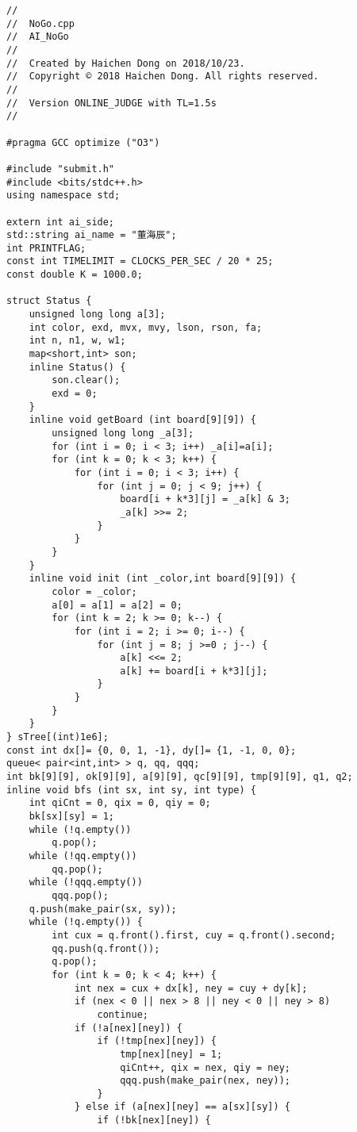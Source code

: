 \documentclass[UTF8]{article}
\theoremstyle{definition}
\begin{document}
\begin{lstlisting}
//
//  NoGo.cpp
//  AI_NoGo
//
//  Created by Haichen Dong on 2018/10/23.
//  Copyright © 2018 Haichen Dong. All rights reserved.
//
//  Version ONLINE_JUDGE with TL=1.5s
//

#pragma GCC optimize ("O3")

#include "submit.h"
#include <bits/stdc++.h>
using namespace std;

extern int ai_side;
std::string ai_name = "董海辰";
int PRINTFLAG;
const int TIMELIMIT = CLOCKS_PER_SEC / 20 * 25;
const double K = 1000.0;

struct Status {
    unsigned long long a[3];
    int color, exd, mvx, mvy, lson, rson, fa;
    int n, n1, w, w1;
    map<short,int> son;
    inline Status() {
        son.clear();
        exd = 0;
    }
    inline void getBoard (int board[9][9]) {
        unsigned long long _a[3];
        for (int i = 0; i < 3; i++) _a[i]=a[i];
        for (int k = 0; k < 3; k++) {
            for (int i = 0; i < 3; i++) {
                for (int j = 0; j < 9; j++) {
                    board[i + k*3][j] = _a[k] & 3;
                    _a[k] >>= 2;
                }
            }
        }
    }
    inline void init (int _color,int board[9][9]) {
        color = _color;
        a[0] = a[1] = a[2] = 0;
        for (int k = 2; k >= 0; k--) {
            for (int i = 2; i >= 0; i--) {
                for (int j = 8; j >=0 ; j--) {
                    a[k] <<= 2;
                    a[k] += board[i + k*3][j];
                }
            }
        }
    }
} sTree[(int)1e6];
const int dx[]= {0, 0, 1, -1}, dy[]= {1, -1, 0, 0};
queue< pair<int,int> > q, qq, qqq;
int bk[9][9], ok[9][9], a[9][9], qc[9][9], tmp[9][9], q1, q2;
inline void bfs (int sx, int sy, int type) {
    int qiCnt = 0, qix = 0, qiy = 0;
    bk[sx][sy] = 1;
    while (!q.empty())
        q.pop();
    while (!qq.empty())
        qq.pop();
    while (!qqq.empty())
        qqq.pop();
    q.push(make_pair(sx, sy));
    while (!q.empty()) {
        int cux = q.front().first, cuy = q.front().second;
        qq.push(q.front());
        q.pop();
        for (int k = 0; k < 4; k++) {
            int nex = cux + dx[k], ney = cuy + dy[k];
            if (nex < 0 || nex > 8 || ney < 0 || ney > 8)
                continue;
            if (!a[nex][ney]) {
                if (!tmp[nex][ney]) {
                    tmp[nex][ney] = 1;
                    qiCnt++, qix = nex, qiy = ney;
                    qqq.push(make_pair(nex, ney));
                }
            } else if (a[nex][ney] == a[sx][sy]) {
                if (!bk[nex][ney]) {

\end{lstlisting}
\end{document}
